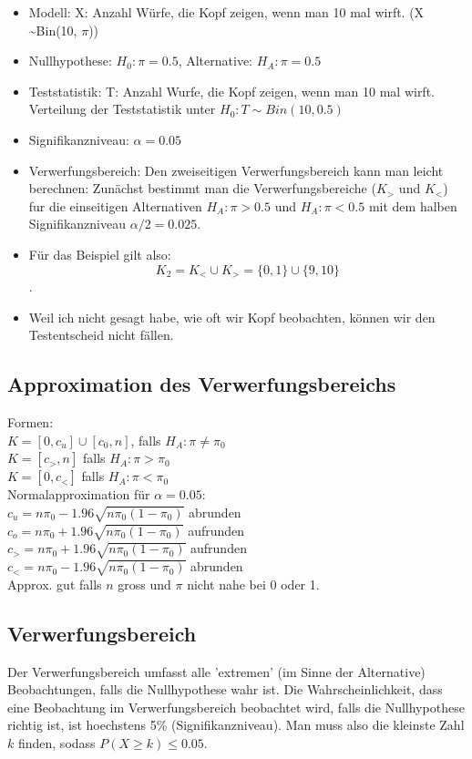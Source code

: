 \documentclass{article}
\begin{document}
\begin{multicols*}{3}
\begin{itemize}
      \end{itemize}
        \begin{itemize}
          \item Modell: X: Anzahl Würfe, die Kopf zeigen, wenn man 10 mal wirft. (X \sim Bin(10, $\pi$))
          \item Nullhypothese: $H_0 : \pi = 0.5$, Alternative: $H_A : \pi = 0.5$
          \item Teststatistik: T: Anzahl Wurfe, die Kopf zeigen, wenn man 10 mal wirft.
          Verteilung der Teststatistik unter $H_0: T \sim Bin(10, 0.5)$
          \item  Signifikanzniveau: $\alpha = 0.05$
          \item Verwerfungsbereich: Den zweiseitigen Verwerfungsbereich kann man
          leicht berechnen: Zunächst bestimmt man die Verwerfungsbereiche ($K_>$
          und $K_<$) fur die einseitigen Alternativen $H_A : \pi > 0.5$ und $H_A : \pi <
          0.5$ mit dem halben Signifikanzniveau $\alpha / 2 = 0.025$.
          \item Für das Beispiel gilt also: $$K_2=K_< \cup K_> = \{0,1\} \cup \{9,10\}$$.
          \item Weil ich nicht gesagt habe, wie oft wir Kopf beobachten,
          können wir den Testentscheid nicht fällen.
        \end{itemize}
    \subsection{Approximation des Verwerfungsbereichs}
      Formen: \\
      $K=[0,c_u]\cup [c_0,n]$, falls $H_A:\pi \neq \pi_0$\\
      $K = [c_>,n]$ falls $H_A:\pi > \pi_0$\\
      $K= [0,c_<]$ falls $H_A: \pi < \pi_0$\\
      Normalapproximation für $\alpha = 0.05$:\\
      $c_u = n\pi _0-1.96\sqrt{n\pi_0(1-\pi_0)}$ abrunden\\
      $c_o = n\pi _0+1.96\sqrt{n\pi_0(1-\pi_0)}$ aufrunden\\
      $c_> = n\pi_0+1.96\sqrt{n\pi_0(1-\pi_0)}$ aufrunden\\
      $c_< = n\pi_0-1.96\sqrt{n\pi_0(1-\pi_0)}$ abrunden\\
      Approx. gut falls $n$ gross und $\pi$ nicht nahe bei 0 oder 1.
    \subsection{Verwerfungsbereich}
      Der Verwerfungsbereich umfasst alle 'extremen' (im Sinne der Alternative) Beobachtungen, falls die Nullhypothese wahr ist. Die Wahrscheinlichkeit, dass eine Beobachtung im Verwerfungsbereich beobachtet wird,
      falls die Nullhypothese richtig ist, ist hoechstens 5\% (Signifikanzniveau). Man muss also die kleinste Zahl $k$ finden, sodass $P(X\geq k)\leq 0.05$.

\end{multicols*}
\end{document}
